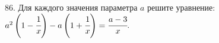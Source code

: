 86. Для каждого значения параметра $a$ решите уравнение: $a^2\left(1-\cfrac{1}{x}\right)-a\left(1+\cfrac{1}{x}\right)=\cfrac{a-3}{x}.$\\
